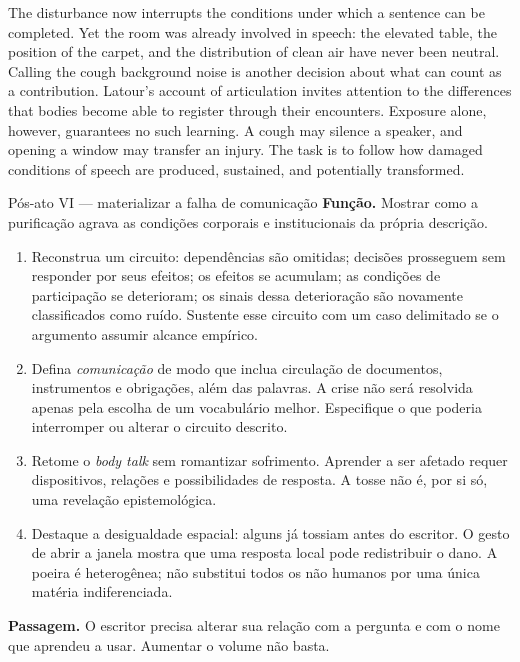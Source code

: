 The disturbance now interrupts the conditions under which a sentence can
be completed. Yet the room was already involved in speech: the elevated
table, the position of the carpet, and the distribution of clean air have
never been neutral. Calling the cough background noise is another
decision about what can count as a contribution. Latour's account of
articulation invites attention to the differences that bodies become
able to register through their encounters.
Exposure alone, however, guarantees no such learning. A cough may silence
a speaker, and opening a window may transfer an injury. The task is to
follow how damaged conditions of speech are produced, sustained, and
potentially transformed.

\begin{orientacao}{Pós-ato VI --- materializar a falha de comunicação}
\textbf{Função.} Mostrar como a purificação agrava as condições corporais
e institucionais da própria descrição.
\begin{enumerate}
\item Reconstrua um circuito: dependências são omitidas; decisões
prosseguem sem responder por seus efeitos; os efeitos se acumulam;
as condições de participação se deterioram; os sinais dessa
deterioração são novamente classificados como ruído. Sustente esse
circuito com um caso delimitado se o argumento assumir alcance empírico.
\item Defina \textit{comunicação} de modo que inclua circulação de
documentos, instrumentos e obrigações, além das palavras. A crise
não será resolvida apenas pela escolha de um vocabulário melhor.
Especifique o que poderia interromper ou alterar o circuito descrito.
\item Retome o \textit{body talk} sem romantizar sofrimento. Aprender
a ser afetado requer dispositivos, relações e possibilidades de
resposta. A tosse não é, por si só, uma revelação epistemológica.
\item Destaque a desigualdade espacial: alguns já tossiam antes do
escritor. O gesto de abrir a janela mostra que uma resposta local
pode redistribuir o dano. A poeira é heterogênea; não substitui todos
os não humanos por uma única matéria indiferenciada.
\end{enumerate}
\textbf{Passagem.} O escritor precisa alterar sua relação com a pergunta
e com o nome que aprendeu a usar. Aumentar o volume não basta.
\end{orientacao}

